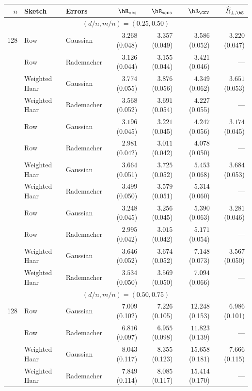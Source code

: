\begin{tabular}{@{}rllrrrr@{}}
\toprule
 $n$ & Sketch & Errors & $\hR_{\mathrm{obs}}$ & $\hR_{\mathrm{sens}}$ & $\hR_{\GCV}$ & $\widehat R_{\perp,\bS}$ \\
\midrule
\multicolumn{7}{c}{$(d/n,m/n)=(0.25,0.50)$} \\
\midrule
128 & Row & Gaussian & $3.268$ (0.048) & $3.357$ (0.049) & $3.586$ (0.052) & $3.220$ (0.047) \\
 & Row & Rademacher & $3.126$ (0.044) & $3.155$ (0.044) & $3.421$ (0.046) & --- \\
 & Weighted Haar & Gaussian & $3.774$ (0.055) & $3.876$ (0.056) & $4.349$ (0.062) & $3.651$ (0.053) \\
 & Weighted Haar & Rademacher & $3.568$ (0.052) & $3.691$ (0.054) & $4.227$ (0.055) & --- \\
\addlinespace[3pt]
256 & Row & Gaussian & $3.196$ (0.045) & $3.221$ (0.045) & $4.247$ (0.056) & $3.174$ (0.045) \\
 & Row & Rademacher & $2.981$ (0.042) & $3.011$ (0.042) & $4.078$ (0.050) & --- \\
 & Weighted Haar & Gaussian & $3.664$ (0.051) & $3.725$ (0.052) & $5.453$ (0.068) & $3.684$ (0.053) \\
 & Weighted Haar & Rademacher & $3.499$ (0.050) & $3.579$ (0.051) & $5.314$ (0.060) & --- \\
\addlinespace[3pt]
512 & Row & Gaussian & $3.248$ (0.045) & $3.256$ (0.045) & $5.390$ (0.063) & $3.281$ (0.046) \\
 & Row & Rademacher & $2.995$ (0.042) & $3.015$ (0.042) & $5.171$ (0.054) & --- \\
 & Weighted Haar & Gaussian & $3.646$ (0.052) & $3.674$ (0.052) & $7.148$ (0.073) & $3.567$ (0.050) \\
 & Weighted Haar & Rademacher & $3.534$ (0.050) & $3.569$ (0.050) & $7.094$ (0.066) & --- \\
\midrule
\multicolumn{7}{c}{$(d/n,m/n)=(0.50,0.75)$} \\
\midrule
128 & Row & Gaussian & $7.009$ (0.102) & $7.226$ (0.105) & $12.248$ (0.153) & $6.986$ (0.101) \\
 & Row & Rademacher & $6.816$ (0.097) & $6.955$ (0.098) & $11.823$ (0.139) & --- \\
 & Weighted Haar & Gaussian & $8.043$ (0.117) & $8.355$ (0.123) & $15.658$ (0.181) & $7.666$ (0.115) \\
 & Weighted Haar & Rademacher & $7.849$ (0.114) & $8.085$ (0.117) & $15.414$ (0.170) & --- \\

\end{tabular}

